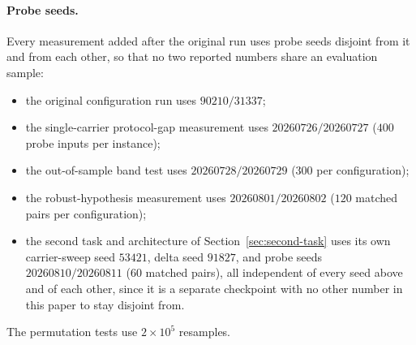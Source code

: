 \documentclass[11pt,a4paper]{article}
\begin{document}
\paragraph{Probe seeds.} Every measurement added after the original run uses
probe seeds disjoint from it and from each other, so that no two reported
numbers share an evaluation sample:
\begin{itemize}
\item the original configuration run uses $90210/31337$;
\item the single-carrier protocol-gap measurement uses $20260726/20260727$
($400$ probe inputs per instance);
\item the out-of-sample band test uses $20260728/20260729$
($300$ per configuration);
\item the robust-hypothesis measurement uses $20260801/20260802$
($120$ matched pairs per configuration);
\item the second task and architecture of Section~\ref{sec:second-task} uses
its own carrier-sweep seed $53421$, delta seed $91827$, and probe seeds
$20260810/20260811$ ($60$ matched pairs), all independent of every seed above
and of each other, since it is a separate checkpoint with no other number in
this paper to stay disjoint from.
\end{itemize}
The permutation tests use $2\times10^5$ resamples.
\end{document}
